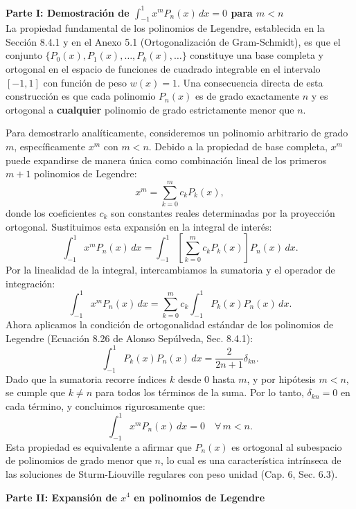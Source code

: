 \documentclass[a4paper]{article}
\begin{document}
\vspace{0.3cm}
\noindent\textbf{Parte I: Demostración de $\displaystyle\int_{-1}^{1} x^m P_n(x) \, dx = 0$ para $m < n$}\\

La propiedad fundamental de los polinomios de Legendre, establecida en la Sección 8.4.1 y en el Anexo 5.1 (Ortogonalización de Gram-Schmidt), es que el conjunto $\{P_0(x), P_1(x), \dots, P_k(x), \dots\}$ constituye una base completa y ortogonal en el espacio de funciones de cuadrado integrable en el intervalo $[-1, 1]$ con función de peso $w(x) = 1$. Una consecuencia directa de esta construcción es que cada polinomio $P_n(x)$ es de grado exactamente $n$ y es ortogonal a \textbf{cualquier} polinomio de grado estrictamente menor que $n$.

Para demostrarlo analíticamente, consideremos un polinomio arbitrario de grado $m$, específicamente $x^m$ con $m < n$. Debido a la propiedad de base completa, $x^m$ puede expandirse de manera única como combinación lineal de los primeros $m+1$ polinomios de Legendre:
$$
x^m = \sum_{k=0}^{m} c_k P_k(x),
$$
donde los coeficientes $c_k$ son constantes reales determinadas por la proyección ortogonal. Sustituimos esta expansión en la integral de interés:
$$
\int_{-1}^{1} x^m P_n(x) \, dx = \int_{-1}^{1} \left[ \sum_{k=0}^{m} c_k P_k(x) \right] P_n(x) \, dx.
$$
Por la linealidad de la integral, intercambiamos la sumatoria y el operador de integración:
$$
\int_{-1}^{1} x^m P_n(x) \, dx = \sum_{k=0}^{m} c_k \int_{-1}^{1} P_k(x) P_n(x) \, dx.
$$
Ahora aplicamos la condición de ortogonalidad estándar de los polinomios de Legendre (Ecuación 8.26 de Alonso Sepúlveda, Sec. 8.4.1):
$$
\int_{-1}^{1} P_k(x) P_n(x) \, dx = \frac{2}{2n+1} \delta_{kn}.
$$
Dado que la sumatoria recorre índices $k$ desde $0$ hasta $m$, y por hipótesis $m < n$, se cumple que $k \neq n$ para todos los términos de la suma. Por lo tanto, $\delta_{kn} = 0$ en cada término, y concluimos rigurosamente que:
$$
\int_{-1}^{1} x^m P_n(x) \, dx = 0 \quad \forall \, m < n.
$$
Esta propiedad es equivalente a afirmar que $P_n(x)$ es ortogonal al subespacio de polinomios de grado menor que $n$, lo cual es una característica intrínseca de las soluciones de Sturm-Liouville regulares con peso unidad (Cap. 6, Sec. 6.3).

\vspace{0.3cm}
\noindent\textbf{Parte II: Expansión de $x^4$ en polinomios de Legendre}\\
\end{document}
